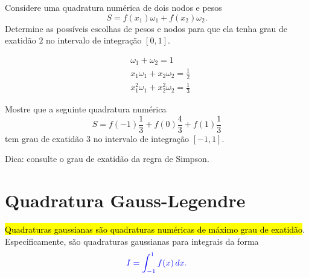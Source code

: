 \begin{exer}
  Considere uma quadratura numérica de dois nodos e pesos
  \begin{equation}
    S = f(x_1)\omega_1 + f(x_2)\omega_2.
  \end{equation}
  Determine as possíveis escolhas de pesos e nodos para que ela tenha grau de exatidão $2$ no intervalo de integração $[0,1]$.
\end{exer}
\begin{resp}
  \begin{align}
    &\omega_1 + \omega_2 = 1\\
    &x_1\omega_1 + x_2\omega_2 = \frac{1}{2}\\
    &x_1^2\omega_1 + x_2^2\omega_2 = \frac{1}{3}
  \end{align}
\end{resp}

\begin{exer}
  Mostre que a seguinte quadratura numérica
  \begin{equation}
    S = f(-1)\frac{1}{3} + f(0)\frac{4}{3} + f(1)\frac{1}{3}
  \end{equation}
  tem grau de exatidão $3$ no intervalo de integração $[-1, 1]$.
\end{exer}
\begin{resp}
  Dica: consulte o grau de exatidão da regra de Simpson.
\end{resp}

\section{Quadratura Gauss-Legendre}\label{cap_integr_sec_Gauss-Legendre}

\hl{Quadraturas gaussianas são quadraturas numéricas de máximo grau de exatidão}. Especificamente,  são quadraturas gaussianas para integrais da forma
\begin{equation}\color{blue}I = \int_{-1}^1 f(x)\,dx.
\end{equation}


